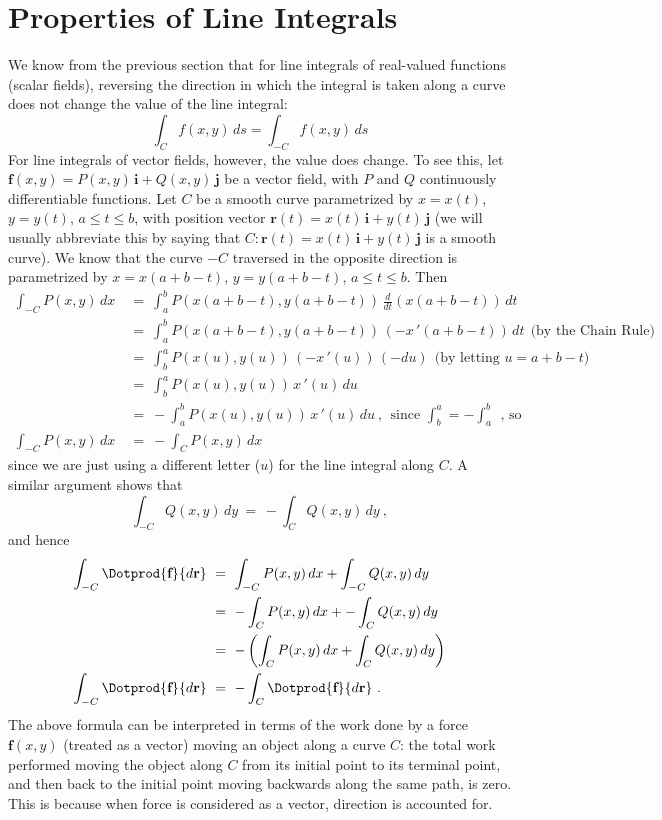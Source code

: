 \section{Properties of Line Integrals}
We know from the previous section that for line integrals of real-valued functions (scalar fields), reversing the
direction in which the integral is taken along a curve does not change the value of the line integral:
\begin{equation}
 \int_C f(x,y)\,ds = \int_{-C} f(x,y)\,ds
\end{equation}
For line integrals of vector fields, however, the value does change. To see this, let $\textbf{f}(x,y) =
P(x,y)\,\textbf{i} + Q(x,y)\,\textbf{j}$ be a vector field, with $P$ and $Q$ continuously differentiable
functions. Let $C$ be a smooth curve parametrized by $x=x(t)$, $y=y(t)$, $a \le t \le b$, with position vector
$\textbf{r}(t) = x(t)\,\textbf{i} + y(t)\,\textbf{j}$ (we will usually abbreviate this by saying that
$C: \textbf{r}(t) = x(t)\,\textbf{i} + y(t)\,\textbf{j}$ is a smooth curve). We know that the curve $-C$ traversed in
the opposite direction is parametrized by $x=x(a+b-t)$, $y=y(a+b-t)$, $a \le t \le b$. Then
\begin{align*}
 \int_{-C} P(x,y)\,dx ~&=~ \int_a^b P(x(a+b-t),y(a+b-t))\,\frac{d}{dt}(x(a+b-t))\,dt\\
  &=~ \int_a^b P(x(a+b-t),y(a+b-t))\,(-x\,'(a+b-t))\,dt~~\text{(by the Chain Rule)}\\
  &=~ \int_b^a P(x(u),y(u))\,(-x\,'(u))\,(-du)~~\text{(by letting $u=a+b-t$)}\\
  &=~ \int_b^a P(x(u),y(u))\,x\,'(u)\,du\\
  &=~ -\int_a^b P(x(u),y(u))\,x\,'(u)\,du~,~~\text{since $\int_b^a = -\int_a^b ~~$, so}\\
  \int_{-C} P(x,y)\,dx ~&=~ -\int_C P(x,y)\,dx
\end{align*}
since we are just using a different letter ($u$) for the line integral along $C$. A similar argument shows that
\begin{displaymath}
 \int_{-C} Q(x,y)\,dy ~=~ -\int_C Q(x,y)\,dy ~,
\end{displaymath}
and hence
\begin{align}
 \int_{-C} \Dotprod{\textbf{f}}{d\textbf{r}} ~&=~ \int_{-C} P(x,y)\,dx + \int_{-C} Q(x,y)\,dy\notag\\
  &=~ -\int_C P(x,y)\,dx + -\int_C Q(x,y)\,dy\notag\\
  &=~ -\left( \int_C P(x,y)\,dx + \int_C Q(x,y)\,dy \right)\notag\\
  \int_{-C} \Dotprod{\textbf{f}}{d\textbf{r}} ~&=~ -\int_C \Dotprod{\textbf{f}}{d\textbf{r}} ~.
\end{align}
   The above formula can be interpreted in terms of the work done by a force $\textbf{f}(x,y)$ (treated as a vector) moving
an object along a curve $C$: the total work performed moving the object along $C$ from its initial point to its terminal
point, and then back to the initial point moving backwards along the same path, is zero. This is because when force is
considered as a vector, direction is accounted for.

